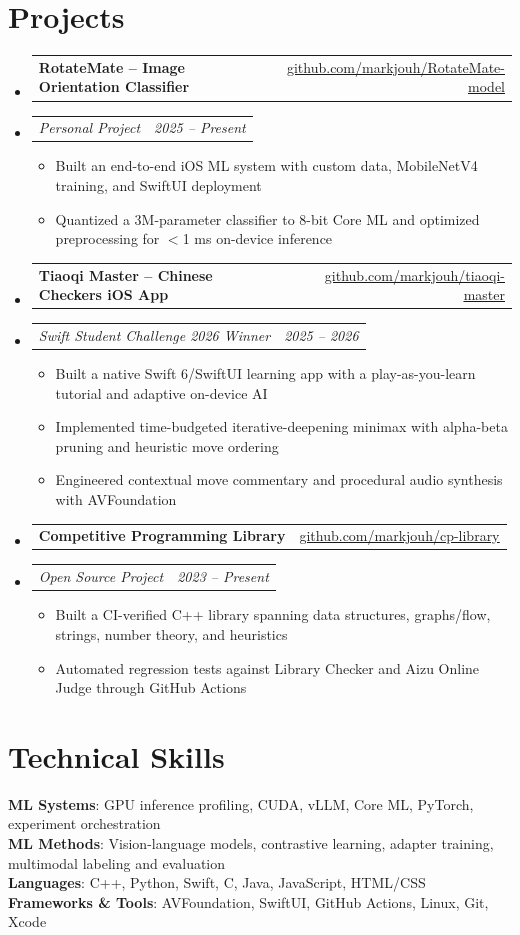 \documentclass[letterpaper,11pt]{article}
\makeatletter
\newcommand{\resumeItem}[1]{
  \item\small{
    {#1 \vspace{-2pt}}
  }
}
\newcommand{\resumeSubSubheading}[2]{
    \item
    \begin{tabular*}{0.97\textwidth}{l@{\extracolsep{\fill}}r}
      \textit{\small#1} & \textit{\small #2} \\
    \end{tabular*}\vspace{-7pt}
}
\newcommand{\resumeProjectHeading}[2]{
    \item
    \begin{tabular*}{0.97\textwidth}{l@{\extracolsep{\fill}}r}
      \small#1 & #2 \\
    \end{tabular*}\vspace{-7pt}
}
\newcommand{\resumeSubHeadingListStart}{\begin{itemize}[leftmargin=0.15in, label={}]}
\newcommand{\resumeSubHeadingListEnd}{\end{itemize}}
\newcommand{\resumeItemListStart}{\begin{itemize}}
\newcommand{\resumeItemListEnd}{\end{itemize}\vspace{-5pt}}
\makeatother
\begin{document}
\section{Projects}
    \resumeSubHeadingListStart
      \resumeProjectHeading
          {\textbf{RotateMate -- Image Orientation Classifier}}{\href{https://github.com/markjouh/RotateMate-model}{\underline{github.com/markjouh/RotateMate-model}}}
          \resumeSubSubheading{Personal Project}{2025 -- Present}
          \resumeItemListStart
            \resumeItem{Built an end-to-end iOS ML system with custom data, MobileNetV4 training, and SwiftUI deployment}
            \resumeItem{Quantized a 3M-parameter classifier to 8-bit Core ML and optimized preprocessing for $<$1 ms on-device inference}
          \resumeItemListEnd
      \resumeProjectHeading
          {\textbf{Tiaoqi Master -- Chinese Checkers iOS App}}{\href{https://github.com/markjouh/tiaoqi-master}{\underline{github.com/markjouh/tiaoqi-master}}}
          \resumeSubSubheading{Swift Student Challenge 2026 Winner}{2025 -- 2026}
          \resumeItemListStart
            \resumeItem{Built a native Swift 6/SwiftUI learning app with a play-as-you-learn tutorial and adaptive on-device AI}
            \resumeItem{Implemented time-budgeted iterative-deepening minimax with alpha-beta pruning and heuristic move ordering}
            \resumeItem{Engineered contextual move commentary and procedural audio synthesis with AVFoundation}
          \resumeItemListEnd
      \resumeProjectHeading
          {\textbf{Competitive Programming Library}}{\href{https://github.com/markjouh/cp-library}{\underline{github.com/markjouh/cp-library}}}
          \resumeSubSubheading{Open Source Project}{2023 -- Present}
          \resumeItemListStart
            \resumeItem{Built a CI-verified C++ library spanning data structures, graphs/flow, strings, number theory, and heuristics}
            \resumeItem{Automated regression tests against Library Checker and Aizu Online Judge through GitHub Actions}
          \resumeItemListEnd
    \resumeSubHeadingListEnd

\section{Technical Skills}
 \begin{itemize}[leftmargin=0.15in, label={}]
    \small{\item{
     \textbf{ML Systems}{: GPU inference profiling, CUDA, vLLM, Core ML, PyTorch, experiment orchestration} \\
     \textbf{ML Methods}{: Vision-language models, contrastive learning, adapter training, multimodal labeling and evaluation} \\
     \textbf{Languages}{: C++, Python, Swift, C, Java, JavaScript, HTML/CSS} \\
     \textbf{Frameworks \& Tools}{: AVFoundation, SwiftUI, GitHub Actions, Linux, Git, Xcode}
    }}
 \end{itemize}
\end{document}
